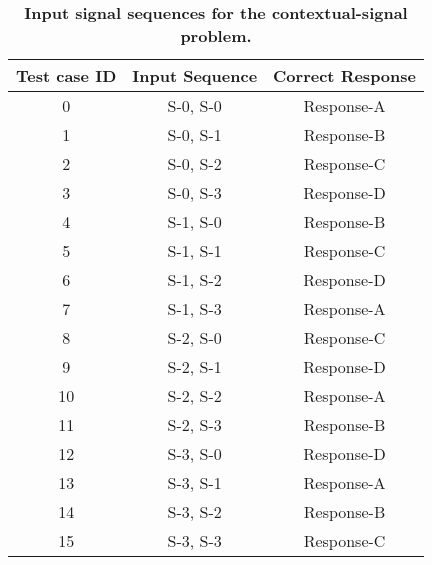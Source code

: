 
\begin{table}[h!]
    \small
    \centering
    \begin{tabular}{c | c | c}
        \toprule
        Test case ID & Input Sequence & Correct Response \\ \hline 
        0 &
        S-0, S-0 &
        Response-A \\ 
        1 &
        S-0, S-1 &
        Response-B \\  
        2 &
        S-0, S-2 &
        Response-C \\  
        3 &
        S-0, S-3 &
        Response-D \\ 
        
        4 &
        S-1, S-0 &
        Response-B \\ 
        5 &
        S-1, S-1 &
        Response-C \\ 
        6 &
        S-1, S-2 &
        Response-D \\ 
        7 &
        S-1, S-3 &
        Response-A \\ 
        
        8 &
        S-2, S-0 &
        Response-C \\ 
        9 &
        S-2, S-1 &
        Response-D \\ 
        10 &
        S-2, S-2 &
        Response-A \\ 
        11 &
        S-2, S-3 &
        Response-B \\ 
        
        12 &
        S-3, S-0 &
        Response-D \\ 
        13 &
        S-3, S-1 &
        Response-A \\ 
        14 &
        S-3, S-2 &
        Response-B \\ 
        15 &
        S-3, S-3 &
        Response-C \\ 
        \bottomrule
    \end{tabular}
    \caption{\small 
    \textbf{Input signal sequences for the contextual-signal problem.} 
    }
    \label{chapter:tag-based-regulation:tab:context-signal-input-combos}
\end{table}